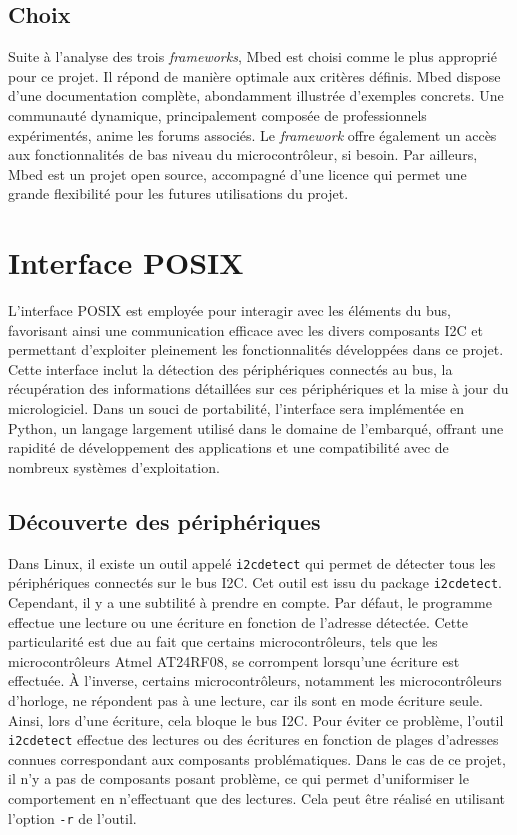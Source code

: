 \subsection{Choix}

Suite à l'analyse des trois \textit{\gls{framework}s}, Mbed est choisi comme le plus approprié pour ce projet.
Il répond de manière optimale aux critères définis.
Mbed dispose d'une documentation complète, abondamment illustrée d'exemples concrets.
Une communauté dynamique, principalement composée de professionnels expérimentés, anime les forums associés.
Le \textit{\gls{framework}} offre également un accès aux fonctionnalités de bas niveau du microcontrôleur, si besoin.
Par ailleurs, Mbed est un projet open source, accompagné d'une licence qui permet une grande flexibilité pour les futures utilisations du projet.

\section{Interface POSIX}

L'interface POSIX est employée pour interagir avec les éléments du bus, favorisant ainsi une communication efficace avec les divers composants I2C et permettant d'exploiter pleinement les fonctionnalités développées dans ce projet.
Cette interface inclut la détection des périphériques connectés au bus, la récupération des informations détaillées sur ces périphériques et la mise à jour du micrologiciel.
Dans un souci de portabilité, l'interface sera implémentée en Python, un langage largement utilisé dans le domaine de l'embarqué, offrant une rapidité de développement des applications et une compatibilité avec de nombreux systèmes d'exploitation.

\subsection{Découverte des périphériques}

Dans Linux, il existe un outil appelé \texttt{i2cdetect} qui permet de détecter tous les périphériques connectés sur le bus I2C.
Cet outil est issu du package \texttt{i2cdetect}.
Cependant, il y a une subtilité à prendre en compte.
Par défaut, le programme effectue une lecture ou une écriture en fonction de l'adresse détectée.
Cette particularité est due au fait que certains microcontrôleurs, tels que les microcontrôleurs Atmel AT24RF08, se corrompent lorsqu'une écriture est effectuée.
À l'inverse, certains microcontrôleurs, notamment les microcontrôleurs d'horloge, ne répondent pas à une lecture, car ils sont en mode écriture seule.
Ainsi, lors d'une écriture, cela bloque le bus I2C.
Pour éviter ce problème, l'outil \texttt{i2cdetect} effectue des lectures ou des écritures en fonction de plages d'adresses connues correspondant aux composants problématiques.
Dans le cas de ce projet, il n'y a pas de composants posant problème, ce qui permet d'uniformiser le comportement en n'effectuant que des lectures.
Cela peut être réalisé en utilisant l'option \texttt{-r} de l'outil.

